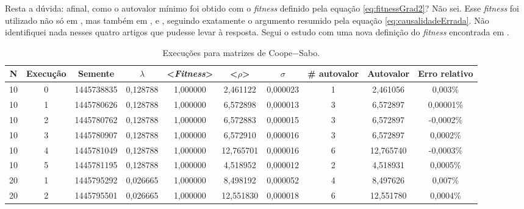 Resta a dúvida: afinal, como o autovalor mínimo foi obtido com o \textit{fitness} definido pela equação \ref{eq:fitnessGrad2}? Não sei. Esse \textit{fitness} foi utilizado não só em \cite{metodo2004}, mas também em \cite{metodo2006}, \cite{metodo2008} e \cite{metodo2009}, seguindo exatamente o argumento resumido pela equação \ref{eq:causalidadeErrada}. Não identifiquei nada nesses quatro artigos que pudesse levar à resposta. Segui o estudo com uma nova definição do \textit{fitness} encontrada em \cite{metodo2011}.

\begin{landscape}
\begin{center}
\begin{table}[htbp]
\caption{Execuções para matrizes de Coope$-$Sabo.}
\label{tab:execucoes10a40}
\begin{tabular}{cccccccccc}
\hline \hline
   \textbf{N} & \textbf{Execução} & \textbf{Semente} & \textbf{$\lambda$} & \textbf{<\textit{Fitness}>} & \textbf{<$\rho$>} & \textbf{$\sigma$} & \textbf{\# autovalor} & \textbf{Autovalor} & \textbf{Erro relativo} \\
\hline \hline
        10 &          0 & 1445738835 &   0,128788 &   1,000000 &   2,461122 &   0,000023 &          1 &   2,461056 &    0,003\% \\
\hline
        10 &          1 & 1445780626 &   0,128788 &   1,000000 &   6,572898 &   0,000013 &          3 &   6,572897 &  0,00001\% \\
\hline
        10 &          2 & 1445780762 &   0,128788 &   1,000000 &   6,572883 &   0,000015 &          3 &   6,572897 &  -0,0002\% \\
\hline
        10 &          3 & 1445780907 &   0,128788 &   1,000000 &   6,572910 &   0,000016 &          3 &   6,572897 &   0,0002\% \\
\hline
        10 &          4 & 1445781049 &   0,128788 &   1,000000 &  12,765701 &   0,000016 &          6 &  12,765740 &  -0,0003\% \\
\hline
        10 &          5 & 1445781195 &   0,128788 &   1,000000 &   4,518952 &   0,000012 &          2 &   4,518931 &   0,0005\% \\
\hline
        20 &          1 & 1445795292 &   0,026665 &   1,000000 &   8,498192 &   0,000052 &          4 &   8,497626 &    0,007\% \\
\hline
        20 &          2 & 1445795501 &   0,026665 &   1,000000 &  12,551830 &   0,000018 &          6 &  12,551780 &   0,0004\% \\

\end{tabular}
\end{table}
\end{center}
\end{landscape}

